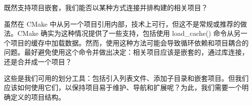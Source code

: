 既然支持项目嵌套，我们能否以某种方式连接并排构建的相关项目？


虽然在 CMake 中从另一个项目引用内部，技术上可行，但这不是常规或推荐的做法。CMake 确实为这种情况提供了一些支持，包括使用 load\_cache() 命令从另一个项目的缓存中加载数据。然而，使用这种方法可能会导致循环依赖和项目耦合的问题。最好避免使用这个命令并做出决定：相关项目应该是嵌套的，通过库连接，还是合并成一个项目？

这些是我们可用的划分工具：包括引入列表文件、添加子目录和嵌套项目。但我们应该如何使用它们，以保持项目易于维护、导航和扩展呢？为此，我们需要一个明确定义的项目结构。




















